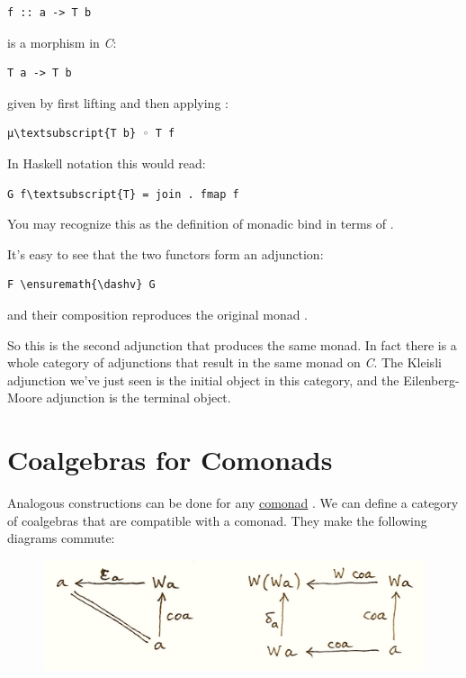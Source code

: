 \begin{verbatim}
f :: a -> T b
\end{verbatim}
is a morphism in \emph{C}:

\begin{verbatim}
T a -> T b
\end{verbatim}
given by first lifting  and then applying :

\begin{Verbatim}[commandchars=\\\{\}]
μ\textsubscript{T b} ◦ T f
\end{Verbatim}
In Haskell notation this would read:

\begin{Verbatim}[commandchars=\\\{\}]
G f\textsubscript{T} = join . fmap f
\end{Verbatim}
You may recognize this as the definition of monadic bind in terms of
.

It's easy to see that the two functors form an adjunction:

\begin{Verbatim}[commandchars=\\\{\}]
F \ensuremath{\dashv} G
\end{Verbatim}
and their composition  reproduces the original monad
.

So this is the second adjunction that produces the same monad. In fact
there is a whole category of adjunctions  that result
in the same monad  on \emph{C}. The Kleisli adjunction we've
just seen is the initial object in this category, and the
Eilenberg-Moore adjunction is the terminal object.

\section{Coalgebras for Comonads}\label{coalgebras-for-comonads}

Analogous constructions can be done for any
\hyperref[comonads]{comonad}
. We can define a category of coalgebras that are compatible
with a comonad. They make the following diagrams commute:

\begin{figure}[H]
\centering
\includegraphics[width=\textwidth]{images/talg5.png}
\end{figure}

